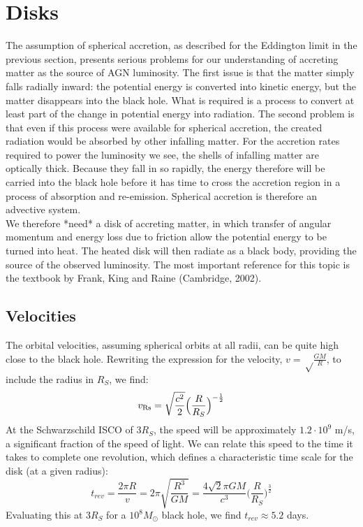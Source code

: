 \documentclass[11pt]{article}
\begin{document}
\section{Disks}
\label{sec:disks}
\noindent
The assumption of spherical accretion, as described for the Eddington limit in the previous section, presents serious problems for our understanding of accreting matter as the source of AGN luminosity. The first issue is that the matter simply falls radially inward: the potential energy is converted into kinetic energy, but the matter disappears into the black hole. What is required is a process to convert at least part of the change in potential energy into radiation. The second problem is that even if this process were available for spherical accretion, the created radiation would be absorbed by other infalling matter. For the accretion rates required to power the luminosity we see, the shells of infalling matter are optically thick. Because they fall in so rapidly, the energy therefore will be carried into the black hole before it has time to cross the accretion region in a process of absorption and re-emission. Spherical accretion is therefore an advective system.\\
\indent We therefore *need* a disk of accreting matter, in which transfer of angular momentum and energy loss due to friction allow the potential energy to be turned into heat. The heated disk will then radiate as a black body, providing the source of the observed luminosity. The most important reference for this topic is the textbook by Frank, King and Raine (Cambridge, 2002).\\

\subsection{Velocities}
The orbital velocities, assuming spherical orbits at all radii, can be quite high close to the black hole. Rewriting the expression for the velocity, $v = \sqrt\frac{GM}{R}$, to include the radius in $R_S$, we find:
\begin{equation}
v_{\rm Rs} = \sqrt\frac{c^2}{2}\Big(\frac{R}{R_S}\Big)^{-\frac{1}{2}}
\end{equation}
At the Schwarzschild ISCO of 3$R_S$, the speed will be approximately $1.2\cdot10^9$ m/s, a significant fraction of the speed of light. We can relate this speed to the time it takes to complete one revolution, which defines a characteristic time scale for the disk (at a given radius):
\begin{equation}
t_{rev} = \frac{2\pi R}{v} = 2\pi\sqrt{\frac{R^3}{GM}} = \frac{4\sqrt{2}\pi GM}{c^3}\Bigg(\frac{R}{R_S}\Bigg)^{\frac{3}{2}}
\end{equation}
Evaluating this at 3$R_S$ for a $10^8 M_{\odot}$ black hole, we find $t_{rev} \approx 5.2$ days.
\end{document}
